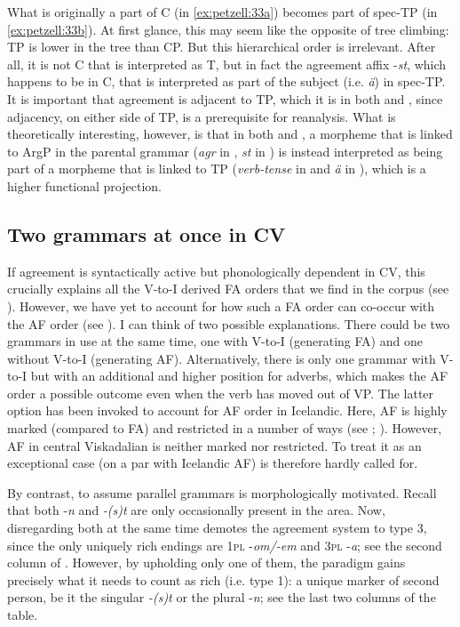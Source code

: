 \documentclass[output=paper,colorlinks,citecolor=brown,draft,draftmode]{langscibook}
\begin{document}
What is originally a part of C (in \ref{ex:petzell:33a}) becomes part of spec-TP (in \ref{ex:petzell:33b}). At first glance, this may seem like the opposite of tree climbing: TP is lower in the tree than CP. But this hierarchical order is irrelevant. After all, it is not C that is interpreted as T, but in fact the agreement affix -\textit{st}, which happens to be in C, that is interpreted as part of the subject (i.e. \textit{ä}) in spec-TP. It is important that agreement is adjacent to TP, which it is in both  and , since adjacency, on either side of TP, is a prerequisite for reanalysis. What is theoretically interesting, however, is that in both  and , a morpheme that is linked to ArgP in the parental grammar (\textit{agr} in , \textit{st} in ) is instead interpreted as being part of a morpheme that is linked to TP (\textit{verb-tense} in  and \textit{ä} in ), which is a higher functional projection.


\subsection{Two grammars at once in CV}\label{sec:petzell:5.3}


If agreement is syntactically active but phonologically dependent in CV, this crucially explains all the V-to-I derived FA orders that we find in the corpus (see ). However, we have yet to account for how such a FA order can co-occur with the AF order (see ). I can think of two possible explanations. There could be two grammars in use at the same time, one with V-to-I (generating FA) and one without V-to-I (generating AF). Alternatively, there is only one grammar with V-to-I but with an additional and higher position for adverbs, which makes the AF order a possible outcome even when the verb has moved out of VP. The latter option has been invoked to account for AF order in Icelandic. Here, AF is highly marked (compared to FA) and restricted in a number of ways (see \citealt{BobaljikThrainsson1998}; \citealt{Thrainsson2007,Thrainsson2010}). However, AF in central Viskadalian is neither marked nor restricted. To treat it as an exceptional case (on a par with Icelandic AF) is therefore hardly called for.



By contrast, to assume parallel grammars is morphologically motivated. Recall that both -\textit{n} and \textit{-(s)t} are only occasionally present in the area. Now, disregarding both at the same time demotes the agreement system to type 3, since the only uniquely rich endings are 1\textsc{pl} -\textit{om/-em} and 3\textsc{pl} -\textit{a}; see the second column of . However, by upholding only one of them, the paradigm gains precisely what it needs to count as rich (i.e. type 1): a unique marker of second person, be it the singular \textit{-(s)t} or the plural -\textit{n}; see the last two columns of the table.
\end{document}
